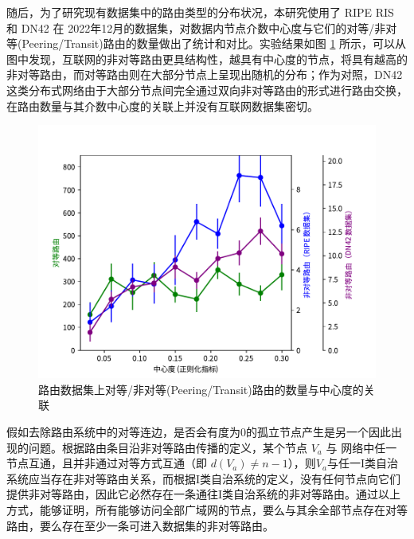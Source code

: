 随后，为了研究现有数据集中的路由类型的分布状况，本研究使用了 RIPE RIS 和 DN42 在 2022年12月的数据集，对数据内节点介数中心度与它们的对等/非对等(Peering/Transit)路由的数量做出了统计和对比。实验结果如图 \ref{c3_route-centrality} 所示，可以从图中发现，互联网的非对等路由更具结构性，越具有中心度的节点，将具有越高的非对等路由，而对等路由则在大部分节点上呈现出随机的分布；作为对照，DN42 这类分布式网络由于大部分节点间完全通过双向非对等路由的形式进行路由交换，在路由数量与其介数中心度的关联上并没有互联网数据集密切。

\begin{figure}[h]
    \includegraphics[width=0.9\linewidth]{chapter/c3_images/c3_route-centrality.pdf}
    \caption{路由数据集上对等/非对等(Peering/Transit)路由的数量与中心度的关联}
    \label{c3_route-centrality}
\end{figure}

假如去除路由系统中的对等连边，是否会有度为0的孤立节点产生是另一个因此出现的问题。根据路由条目沿非对等路由传播的定义，某个节点 $V_a$ 与 网络中任一节点互通，且并非通过对等方式互通（即 $d(V_a)\neq n-1$），则$V_a$与任一I类自治系统应当存在非对等路由关系，而根据I类自治系统的定义，没有任何节点向它们提供非对等路由，因此它必然存在一条通往I类自治系统的非对等路由。通过以上方式，能够证明，所有能够访问全部广域网的节点，要么与其余全部节点存在对等路由，要么存在至少一条可进入数据集的非对等路由。


